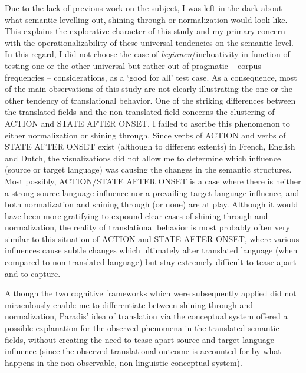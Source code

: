 Due to the lack of previous work on the subject, I was left in the dark about what semantic levelling out, shining through or normalization would look like. This explains the explorative character of this study and my primary concern with the operationalizability of these universal tendencies on the semantic level. In this regard, I did not choose the case of \textit{beginnen}/inchoativity in function of testing one or the other universal but rather out of pragmatic – corpus frequencies – considerations, as a ‘good for all’ test case. As a consequence, most of the main observations of this study are not clearly illustrating the one or the other tendency of translational behavior. One of the striking differences between the translated fields and the non-translated field concerns the clustering of ACTION and STATE AFTER ONSET. I failed to ascribe this phenomenon to either normalization or shining through. Since verbs of ACTION and verbs of STATE AFTER ONSET exist (although to different extents) in French, English and Dutch, the visualizations did not allow me to determine which influence (source or target language) was causing the changes in the semantic structures. Most possibly, ACTION/STATE AFTER ONSET is a case where there is neither a strong source language influence nor a prevailing target language influence, and both normalization and shining through (or none) are at play. Although it would have been more gratifying to expound clear cases of shining through and normalization, the reality of translational behavior is most probably often very similar to this situation of ACTION and STATE AFTER ONSET, where various influences cause subtle changes which ultimately alter translated language (when compared to non-translated language) but stay extremely difficult to tease apart and to capture. 

Although the two cognitive frameworks which were subsequently applied did not miraculously enable me to differentiate between shining through and normalization, Paradis’ idea of translation via the conceptual system offered a possible explanation for the observed phenomena in the translated semantic fields, without creating the need to tease apart source and target language influence (since the observed translational outcome is accounted for by what happens in the non-observable, non-linguistic conceptual system).

